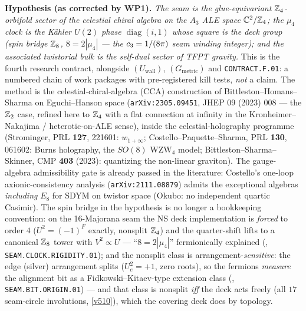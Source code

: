 \par\smallskip\noindent\textbf{Hypothesis (as corrected by WP1).} \emph{The seam is the glue-equivariant
$\mathbb Z_4$-orbifold sector of the celestial chiral algebra on the $A_3$ ALE space $\mathbb C^2/\mathbb Z_4$; the
$\mu_4$ clock is the K\"ahler $U(2)$ phase $\operatorname{diag}(i,1)$ whose square is the deck group
(spin bridge $\mathbb Z_8$, $8=2|\mu_4|$ --- the $c_3=1/(8\pi)$ seam winding integer); and the associated
twistorial bulk is the \emph{self-dual} sector of TFPT gravity.} This is the fourth research contract,
alongside $(U_{\mathrm{wall}})$, $(G_{\mathrm{metric}})$ and \texttt{CONTRACT.F.01}: a numbered chain
of work packages with pre-registered kill tests, \emph{not} a claim. The method is the celestial-chiral-algebra
(CCA) construction of Bittleston--Homans--Sharma on Eguchi--Hanson space
(\texttt{arXiv:2305.09451}, JHEP 09 (2023) 008 --- the $\mathbb Z_2$ case, refined here to $\mathbb Z_4$ with a flat
connection at infinity in the Kronheimer--Nakajima / heterotic-on-ALE sense), inside the celestial-holography
programme (Strominger, PRL \textbf{127}, 221601: $w_{1+\infty}$; Costello--Paquette--Sharma, PRL
\textbf{130}, 061602: Burns holography, the $SO(8)$ WZW$_4$ model; Bittleston--Sharma--Skinner, CMP
\textbf{403} (2023): quantizing the non-linear graviton). The gauge-algebra admissibility gate is already
passed in the literature: Costello's one-loop axionic-consistency analysis (\texttt{arXiv:2111.08879})
admits the exceptional algebras \emph{including} $E_8$ for SDYM on twistor space (Okubo: no independent
quartic Casimir). The spin bridge in the hypothesis is no longer a bookkeeping convention: on the
16-Majorana seam the NS deck implementation is \emph{forced} to order $4$ ($U^2=(-1)^F$ exactly,
nonsplit $\mathbb Z_4$) and the quarter-shift lifts to a canonical $\mathbb Z_8$ tower with $V^2\propto U$ ---
``$8=2|\mu_4|$'' fermionically explained (,
\texttt{SEAM.CLOCK.RIGIDITY.01}); and the nonsplit class is arrangement-\emph{sensitive}: the edge
(silver) arrangement splits ($U_e^2=+1$, zero roots), so the fermions \emph{measure} the alignment
bit as a Fidkowski--Kitaev-type extension class
(, \texttt{SEAM.BIT.ORIGIN.01}) --- and that class is nonsplit
\emph{iff} the deck acts freely (all $17$ seam-circle involutions, \vref{v510}), which the covering
deck does by topology.

